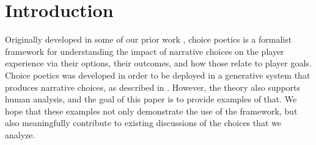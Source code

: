 \documentclass[arts,article,submit,moreauthors,pdftex,10pt,a4paper]{Definitions/mdpi}
\begin{document}
\maketitle

\section{Introduction}

Originally developed in some of our prior work \citep{mawhorter2014towards,mawhorter2015intentionally,mawhorter2015generating,mawhorter2016artificial}, choice poetics is a formalist framework for understanding the impact of narrative choices on the player experience via their options, their outcomes, and how those relate to player goals.
%
Choice poetics was developed in order to be deployed in a generative system that produces narrative choices, as described in \citep{mawhorter2015generating,mawhorter2016artificial}.
%
However, the theory also supports human analysis, and the goal of this paper is to provide examples of that.
%
We hope that these examples not only demonstrate the use of the framework, but also meaningfully contribute to existing discussions of the choices that we analyze.
\end{document}
